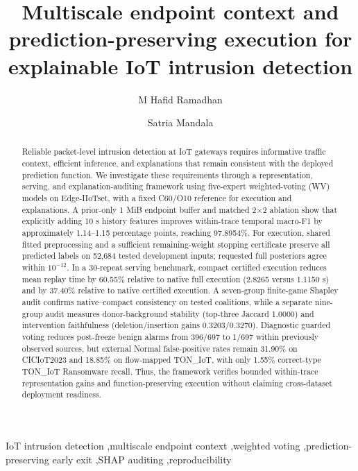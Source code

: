 \documentclass[final,3p,10pt,nopreprintline]{elsarticle}
\begin{document}
\nocite{r1,r2,r3,r4,r5,r20,r27,r28,r29,r6,r7,r8,r9,r10,r11,r12,r21,r22,r23,r24,r25,r13,r14,r15,r16,r17,r18,r19,r26,r30}

\begin{frontmatter}\title{Multiscale endpoint context and prediction-preserving execution for explainable IoT intrusion detection}
\author[humic]{M Hafid Ramadhan}
\author[humic]{Satria Mandala}






\begin{abstract}

Reliable packet-level intrusion detection at IoT gateways requires informative traffic context, efficient inference, and explanations that remain consistent with the deployed prediction function. We investigate these requirements through a representation, serving, and explanation-auditing framework using five-expert weighted-voting (WV) models on Edge-IIoTset, with a fixed C60/O10 reference for execution and explanations. A prior-only 1 MiB endpoint buffer and matched 2\(\times\)2 ablation show that explicitly adding 10 s history features improves within-trace temporal macro-F1 by approximately 1.14--1.15 percentage points, reaching 97.8954\%. For execution, shared fitted preprocessing and a sufficient remaining-weight stopping certificate preserve all predicted labels on 52,684 tested development inputs; requested full posteriors agree within \(10^{-12}\). In a 30-repeat serving benchmark, compact certified execution reduces mean replay time by 60.55\% relative to native full execution (2.8265 versus 1.1150 s) and by 37.40\% relative to native certified execution. A seven-group finite-game Shapley audit confirms native--compact consistency on tested coalitions, while a separate nine-group audit measures donor-background stability (top-three Jaccard 1.0000) and intervention faithfulness (deletion/insertion gains 0.3203/0.3270). Diagnostic guarded voting reduces post-freeze benign alarms from 396/697 to 1/697 within previously observed sources, but external Normal false-positive rates remain 31.90\% on CICIoT2023 and 18.85\% on flow-mapped TON\_IoT, with only 1.55\% correct-type TON\_IoT Ransomware recall. Thus, the framework verifies bounded within-trace representation gains and function-preserving execution without claiming cross-dataset deployment readiness.

\end{abstract}

\begin{keyword}IoT intrusion detection \sep multiscale endpoint context \sep weighted voting \sep prediction-preserving early exit \sep SHAP auditing \sep reproducibility\end{keyword}\end{frontmatter}
\end{document}
